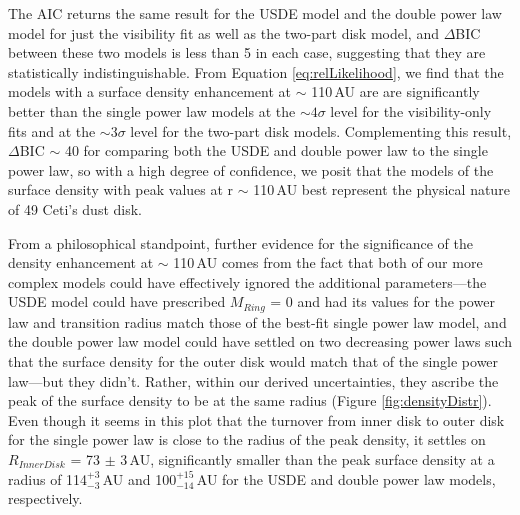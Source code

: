 {{The AIC returns the same result for the USDE model and the double power law model for just the visibility fit as well as the two-part disk model, and $\Delta$BIC between these two models is less than 5 in each case, suggesting that they are statistically indistinguishable. From Equation \ref{eq:relLikelihood}, we find that the models with a surface density enhancement at $\sim$ 110\,AU are are significantly better than the single power law models at the $\sim 4\sigma$ level for the visibility-only fits and at the $\sim 3\sigma$ level for the two-part disk models. Complementing this result, $\Delta$BIC $\sim$ 40 for comparing both the USDE and double power law to the single power law, so with a high degree of confidence, we posit that the models of the surface density with peak values at r $\sim$ 110\,AU best represent the physical nature of 49 Ceti's dust disk. 



From a philosophical standpoint, further evidence for the significance of the density enhancement at $\sim$ 110\,AU comes from the fact that both of our more complex models could have effectively ignored the additional parameters---the USDE model could have prescribed $M_{Ring}$ = 0 and had its values for the power law and transition radius match those of the best-fit single power law model, and the double power law model could have settled on two decreasing power laws such that the surface density for the outer disk would match that of the single power law---but they didn't. Rather, within our derived uncertainties, they ascribe the peak of the surface density to be at the same radius (Figure \ref{fig:densityDistr}). Even though it seems in this plot that the turnover from inner disk to outer disk for the single power law is close to the radius of the peak density, it settles on $R_{Inner Disk}$ = 73 $\pm$ 3\,AU, significantly smaller than the peak surface density at a radius of 114$^{+3}_{-3}$\,AU and 100$^{+15}_{-14}$\,AU for the USDE and double power law models, respectively. 

}}

